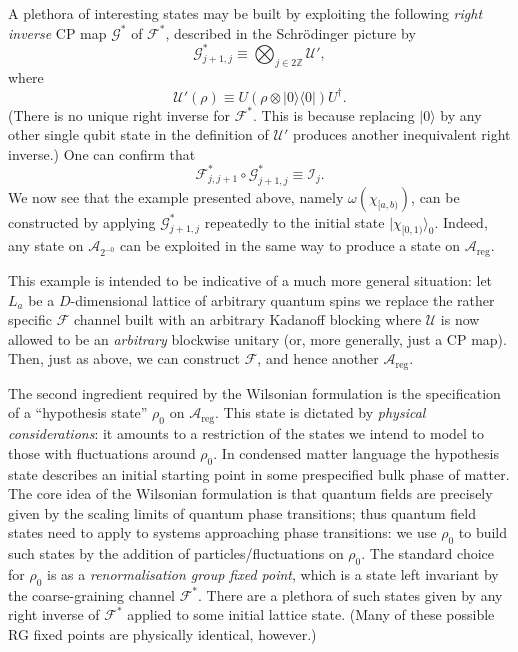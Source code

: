 \documentclass[11pt]{amsart}
\theoremstyle{plain}%
\theoremstyle{definition}
\theoremstyle{remark}
\begin{document}
A plethora of interesting states may be built by exploiting the following \emph{right inverse} CP map $\mathcal{G}^{*}$ of $\mathcal{F}^{*}$, described in the Schr{\"o}dinger picture by
\begin{equation}
	\mathcal{G}_{j+1,j}^{*} \equiv \bigotimes_{j\in 2\mathbb{Z}} \mathcal{U}',
\end{equation}
where
\begin{equation}
	\mathcal{U}'(\rho) \equiv U(\rho\otimes |0\rangle\langle 0|) U^\dag.
\end{equation}
(There is no unique right inverse for $\mathcal{F}^{*}$. This is because replacing $|0\rangle$ by any other single qubit state in the definition of $\mathcal{U}'$ produces another inequivalent right inverse.)
One can confirm that
\begin{equation}
	\mathcal{F}_{j,j+1}^{*}\circ \mathcal{G}_{j+1,j}^{*} \equiv \mathcal{I}_j.
\end{equation}
We now see that the example presented above, namely $\omega(\chi_{[a,b)})$, can be constructed by applying $\mathcal{G}_{j+1,j}^{*}$ repeatedly to the initial state $|\chi_{[0,1)}\rangle_0$. Indeed, any state on $\mathcal{A}_{2^{-0}}$ can be exploited in the same way to produce a state on $\mathcal{A}_{\text{reg}}$.

This example is intended to be indicative of a much more general situation: let $L_a$ be a $D$-dimensional lattice of arbitrary quantum spins we replace the rather specific $\mathcal{F}$ channel built with an arbitrary Kadanoff blocking where $\mathcal{U}$ is now allowed to be an \emph{arbitrary} blockwise unitary (or, more generally, just a CP map). Then, just as above, we can construct $\mathcal{F}$, and hence another $\mathcal{A}_{\text{reg}}$.

The second ingredient required by the Wilsonian formulation is the specification of a ``hypothesis state'' 
$\rho_0$ on $\mathcal{A}_{\text{reg}}$. This state is dictated by \emph{physical considerations}: it amounts to a restriction of the states we intend to model to those with fluctuations around $\rho_0$. In condensed matter language the hypothesis state describes an initial starting point in some prespecified bulk phase of matter. The core idea of the Wilsonian formulation is that quantum fields are precisely given by the scaling limits of quantum phase transitions; thus quantum field states need to apply to systems approaching phase transitions: we use $\rho_0$ to build such states by the addition of particles/fluctuations on $\rho_0$. The standard choice for $\rho_0$ is as a \emph{renormalisation group fixed point}, which is a state left invariant by the coarse-graining channel $\mathcal{F}^*$. There are a plethora of such states given by any right inverse of $\mathcal{F}^*$ applied to some initial lattice state. (Many of these possible RG fixed points are physically identical, however.)
\end{document}
